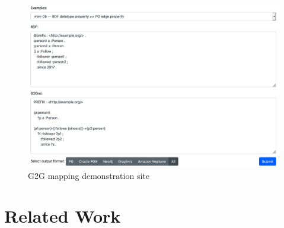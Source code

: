 \documentclass[runningheads]{llncs}
\begin{document}
\begin{figure}
\center
\includegraphics[width=1.0\textwidth]{sandbox.png}
\caption{G2G mapping demonstration site}
\label{fig:sandbox}
\end{figure}




\section{Related Work}
\end{document}
